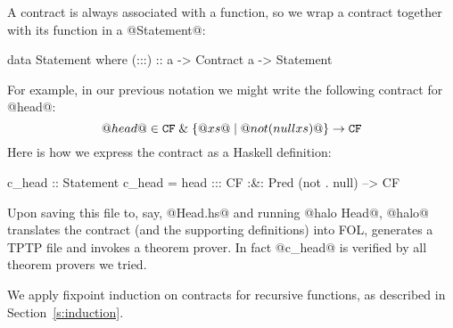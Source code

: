 A contract is always associated with a function, so we wrap a contract
together with its function in a @Statement@:
\begin{code}
data Statement where
    (:::) :: a -> Contract a -> Statement
\end{code}
For example, in our previous notation we might write the following
contract for @head@:
$$
@head@ \in {\tt CF} \;\&\; \{@xs@ \mid @not (null xs)@ \} \rightarrow {\tt CF}
$$
Here is how we express the contract as a Haskell definition:
\begin{comment}
head (x:xs) = x
head []     = error "empty list"

not True = False    null [] = True
not False = True    null xs = False

f . g = \x -> f (g x)
\end{comment}
\begin{code}
c_head :: Statement
c_head = head ::: CF :&: Pred (not . null) --> CF
\end{code}
Upon saving this file to, say, @Head.hs@ and running @halo Head@,
@halo@ translates the contract (and the supporting definitions) into
FOL, generates a TPTP file and invokes a theorem prover.
In fact @c_head@ is verified by all theorem provers we tried.

We apply fixpoint induction on contracts for recursive functions, as
described in Section~\ref{s:induction}.


